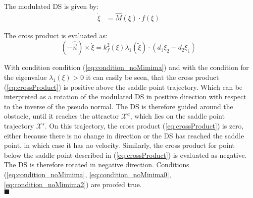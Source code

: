 The modulated DS is given by:
\begin{align}
  \dot{\xi} &= \hat{M}(\xi) \cdot f(\xi)
\end{align}

The cross product is evaluated as:
\begin{equation}
  (- \hat{\vec n}) \times \dot \xi  =
  k_f^2(\xi)  \lambda_{1}(\tilde \xi) \cdot \left( d_1\xi_2 - d_2 \xi_1\right) \label{eq:crossProduct}
\end{equation}

With condition condition (\ref{eq:condition_noMimima}) and with the condition for the eigenvalue $\lambda_1(\xi) > 0 $ it can easily be seen, that the cross product (\ref{eq:crossProduct}) is positive above the saddle point trajectory. Which can be interpreted as a rotation of the modulated DS in positive direction with respect to the inverse of the pseudo normal. The DS is therefore guided around the obstacle, until it reaches the attractor $\mathcal{X}^a$, which lies on the saddle point trajectory $\mathcal{X}^s$. On this trajectory, the cross product (\ref{eq:crossProduct}) is zero, either because there is no change in direction or the DS has reached the saddle point, in which case it has no velocity.
Similarly, the cross product for point below the saddle point described in (\ref{eq:crossProduct}) is evaluated as negative. The DS  is therefore rotated in negative direction. Conditions (\ref{eq:condition_noMimima}, \ref{eq:condition_noMinima0}, \ref{eq:condition_noMimima2}) are proofed true. \\
\hfill $\blacksquare$




